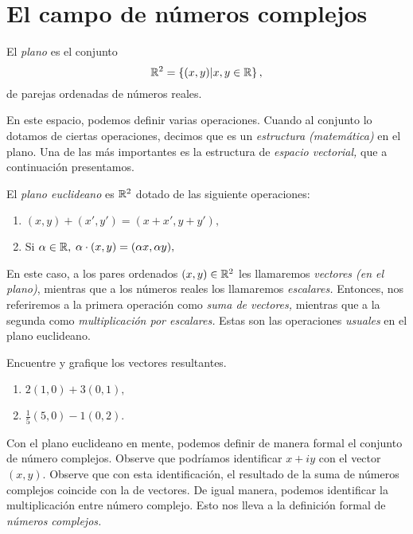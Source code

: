\section{El campo de números complejos}

\begin{defn}El \emph{plano} es el conjunto
$$
\mathbb{R}^{2}=\left\{ (x,y)|x,y\in \mathbb{R}  \right\},
$$
de parejas ordenadas de números reales.
\end{defn}

En este espacio, podemos definir varias operaciones. Cuando al conjunto lo dotamos de ciertas operaciones, decimos que
es un \emph{estructura (matemática)} en el plano. Una de las más importantes es la estructura de \emph{espacio
vectorial,} que a continuación presentamos.

\begin{defn} El \emph{plano euclideano} es $\mathbb{R}^{2}$ dotado de las siguiente operaciones:
 \begin{enumerate}
  \item 
  $
(x,y)+(x',y')=(x+x',y+y'),
  $
  \item Si $\alpha \in \mathbb{R},$
  $
\alpha\cdot(x,y)=(\alpha x,\alpha y),
  $
 \end{enumerate}
 \end{defn}

\begin{rem}
 En este caso, a los pares ordenados $(x,y)\in \mathbb{R}^{2}$ les llamaremos \emph{vectores (en el plano)}, mientras que a los
números reales los llamaremos \emph{escalares.} Entonces, nos referiremos a la primera operación como \emph{suma de
vectores,} mientras que a la segunda como \emph{multiplicación por escalares.} Estas son las operaciones \emph{usuales}
en el plano euclideano.
\end{rem}


\begin{problema}
 Encuentre y grafique los vectores resultantes.
 \begin{enumerate}
  \item $2(1,0)+3(0,1),$
  \item $\frac{1}{5}(5,0)-1(0,2).$
 \end{enumerate}

\end{problema}

Con el plano euclideano en mente, podemos definir de manera formal el conjunto de número complejos. Observe que
podríamos identificar $x+iy$ con el vector $(x,y).$ Observe que con esta identificación, el resultado de la suma de
números complejos coincide con la de vectores. De igual manera, podemos identificar la multiplicación entre número
complejo. Esto nos lleva a la definición formal de \emph{números complejos.}


